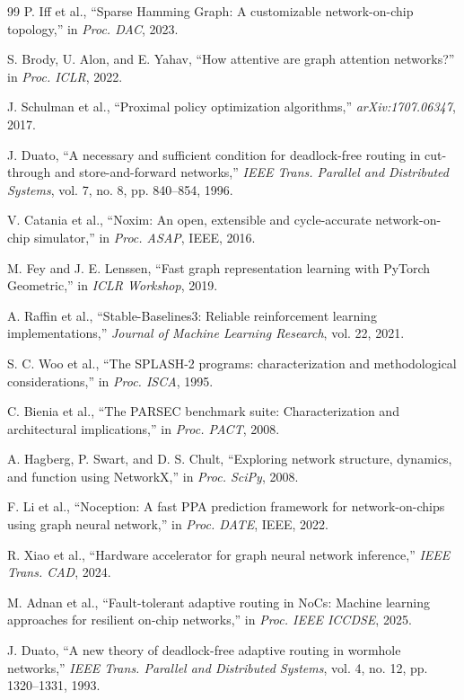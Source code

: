 \documentclass[conference]{IEEEtran}
\begin{document}
\begin{thebibliography}{99}
P. Iff et al., ``Sparse Hamming Graph: A customizable network-on-chip topology,'' in \textit{Proc. DAC}, 2023.

S. Brody, U. Alon, and E. Yahav, ``How attentive are graph attention networks?'' in \textit{Proc. ICLR}, 2022.

J. Schulman et al., ``Proximal policy optimization algorithms,'' \textit{arXiv:1707.06347}, 2017.

J. Duato, ``A necessary and sufficient condition for deadlock-free routing in cut-through and store-and-forward networks,'' \textit{IEEE Trans. Parallel and Distributed Systems}, vol. 7, no. 8, pp. 840--854, 1996.

V. Catania et al., ``Noxim: An open, extensible and cycle-accurate network-on-chip simulator,'' in \textit{Proc. ASAP}, IEEE, 2016.

M. Fey and J. E. Lenssen, ``Fast graph representation learning with PyTorch Geometric,'' in \textit{ICLR Workshop}, 2019.

A. Raffin et al., ``Stable-Baselines3: Reliable reinforcement learning implementations,'' \textit{Journal of Machine Learning Research}, vol. 22, 2021.

S. C. Woo et al., ``The SPLASH-2 programs: characterization and methodological considerations,'' in \textit{Proc. ISCA}, 1995.

C. Bienia et al., ``The PARSEC benchmark suite: Characterization and architectural implications,'' in \textit{Proc. PACT}, 2008.

A. Hagberg, P. Swart, and D. S. Chult, ``Exploring network structure, dynamics, and function using NetworkX,'' in \textit{Proc. SciPy}, 2008.

F. Li et al., ``Noception: A fast PPA prediction framework for network-on-chips using graph neural network,'' in \textit{Proc. DATE}, IEEE, 2022.

R. Xiao et al., ``Hardware accelerator for graph neural network inference,'' \textit{IEEE Trans. CAD}, 2024.

M. Adnan et al., ``Fault-tolerant adaptive routing in NoCs: Machine learning approaches for resilient on-chip networks,'' in \textit{Proc. IEEE ICCDSE}, 2025.

J. Duato, ``A new theory of deadlock-free adaptive routing in wormhole networks,'' \textit{IEEE Trans. Parallel and Distributed Systems}, vol. 4, no. 12, pp. 1320--1331, 1993.

\end{thebibliography}
\end{document}
